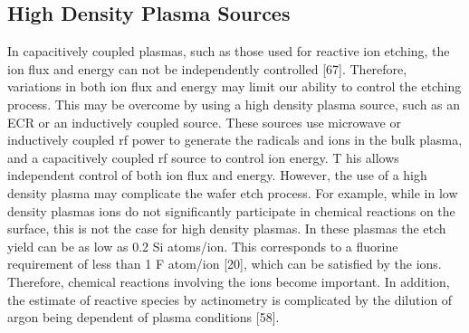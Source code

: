 \subsection{High Density Plasma Sources}

\tab In capacitively coupled plasmas, such as those used for reactive ion etching, the ion flux
and energy can not be independently controlled [67]. Therefore, variations in both ion flux
and energy may limit our ability to control the etching process. This may be overcome
by using a high density plasma source, such as an ECR or an inductively coupled source.
These sources use microwave or inductively coupled rf power to generate the radicals and
ions in the bulk plasma, and a capacitively coupled rf source to control ion energy. T his
allows independent control of both ion flux and energy. However, the use of a high density
plasma may complicate the wafer etch process. For example, while in low density plasmas
ions do not significantly participate in chemical reactions on the surface, this is not the case for high density plasmas. In these plasmas the etch yield can be as low as 0.2 Si atoms/ion. This corresponds to a fluorine requirement of less than 1 F atom/ion [20], which can be satisfied by the ions. Therefore, chemical reactions involving the ions become important. In addition, the estimate of reactive species by actinometry is complicated by the dilution of argon being dependent of plasma conditions [58].


